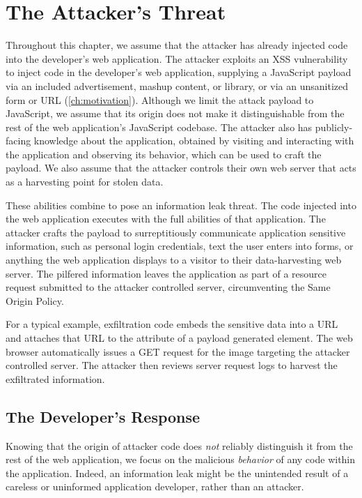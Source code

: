 \section{The Attacker's Threat}
\label{sec:threat-model}

Throughout this chapter, we assume that the attacker has already injected code into the developer's web application.
The attacker exploits an XSS vulnerability to inject code in the developer's web application, supplying a JavaScript payload via an included advertisement, mashup content, or library, or via an unsanitized form or URL (\autoref{ch:motivation}).
Although we limit the attack payload to JavaScript, we assume that its origin does not make it distinguishable from the rest of the web application's JavaScript codebase.
The attacker also has publicly-facing knowledge about the application, obtained by visiting and interacting with the application and observing its behavior, which can be used to craft the payload.
We also assume that the attacker controls their own web server that acts as a harvesting point for stolen data.

These abilities combine to pose an information leak threat.
The code injected into the web application executes with the full abilities of that application.
The attacker crafts the payload to surreptitiously communicate application sensitive information, such as personal login credentials, text the user enters into forms, or anything the web application displays to a visitor to their data-harvesting web server.
The pilfered information leaves the application as part of a resource request submitted to the attacker controlled server, circumventing the Same Origin Policy.

For a typical example, exfiltration code embeds the sensitive data into a URL and attaches that URL to the  attribute of a payload generated  element.
The web browser automatically issues a GET request for the image targeting the attacker controlled server.
The attacker then reviews server request logs to harvest the exfiltrated information.

\subsection{The Developer's Response}

Knowing that the origin of attacker code does \emph{not} reliably distinguish it from the rest of the web application, we focus on the malicious \emph{behavior} of any code within the application.
Indeed, an information leak might be the unintended result of a careless or uninformed application developer, rather than an attacker.

